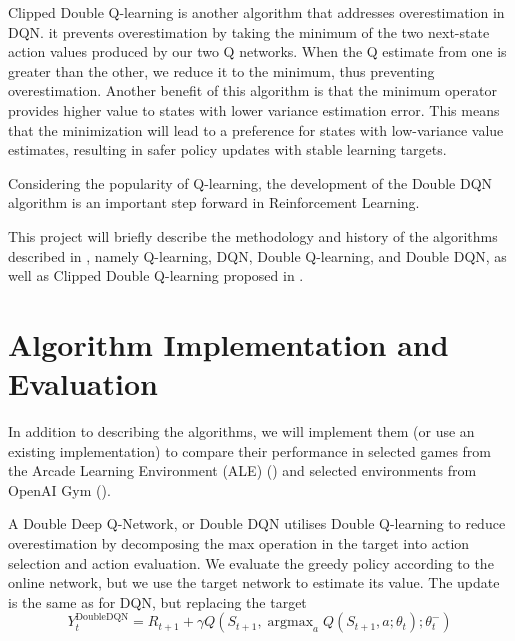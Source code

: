 \documentclass{article}
\DeclareMathOperator*{\argmax}{argmax}
\begin{document}
Clipped Double Q-learning is another algorithm that addresses overestimation in
DQN. it prevents overestimation by taking the minimum of the two next-state
action values produced by our two Q networks.  When the Q estimate from one is
greater than the other, we reduce it to the minimum, thus preventing
overestimation.  Another benefit of this algorithm is that the minimum operator
provides higher value to states with lower variance estimation error.  This
means that the minimization will lead to a preference for states with
low-variance value estimates, resulting in safer policy updates with stable
learning targets.



Considering the popularity of Q-learning, the development of the Double DQN
algorithm is an important step forward in Reinforcement Learning.

This project will briefly describe the methodology and history of the algorithms
described in \citet{van2016deep}, namely Q-learning, DQN, Double Q-learning, and
Double DQN, as well as Clipped Double Q-learning proposed in
\citet{fujimoto2018addressing}. 


\section{Algorithm Implementation and Evaluation}

In addition to describing the algorithms, we will implement them (or use an
existing implementation) to compare their performance in selected games from the
Arcade Learning Environment (ALE) (\citet{bellemare2013arcade}) and selected
environments from OpenAI Gym (\citet{brockman2016openai}).


A Double Deep Q-Network, or Double DQN utilises Double Q-learning to reduce
overestimation by decomposing the max operation in the target into action
selection and action evaluation. We evaluate the greedy policy according to the
online network, but we use the target network to estimate its value. The update
is the same as for DQN, but replacing the target
\[
    Y_{t}^{\text{DoubleDQN}} = R_{t+1} + \gamma Q(S_{t+1}, \argmax_a Q(S_{t+1},
    a; \theta _{t});\theta _{t}^{-})
\]
\end{document}
